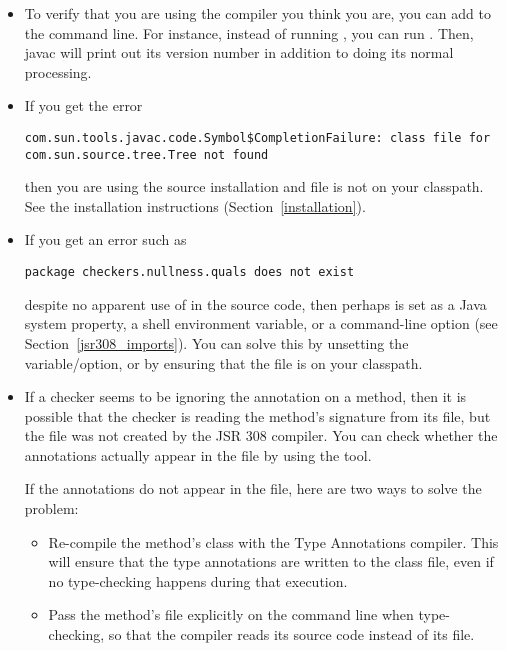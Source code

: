 \begin{itemize}

\item
To verify that you are using the compiler you think you are, you can add
 to the command line.  For instance, instead of running
, you can run .  Then, javac will print out its version number in addition
to doing its normal processing.


\item
If you get the error

\begin{smaller}
\begin{Verbatim}
com.sun.tools.javac.code.Symbol$CompletionFailure: class file for com.sun.source.tree.Tree not found
\end{Verbatim}
\end{smaller}

\noindent
then you are using the source installation and file  is not
on your classpath.  See the installation instructions
(Section~\ref{installation}).


\item
If you get an error such as

\begin{Verbatim}
package checkers.nullness.quals does not exist
\end{Verbatim}

  \noindent
  despite no apparent use of  in
  the source code, then perhaps
   is set as a Java system property, a shell
  environment variable, or a command-line option (see
  Section~\ref{jsr308_imports}).  You can solve this by unsetting the
  variable/option, or by ensuring that the  file is on
  your classpath.


\item
If a checker seems to be ignoring the annotation on a method, then it is
possible that the checker is reading the method's signature from its
 file, but the  file was not created by the JSR
308 compiler.  You can check whether the annotations actually appear in the
 file by using the  tool.

If the annotations do not appear in the  file, here are two
ways to solve the problem:
\begin{itemize}
\item
  Re-compile the method's class with the Type Annotations compiler.  This will
  ensure that the type annotations are written to the class file, even if
  no type-checking happens during that execution.
\item
  Pass the method's file explicitly on the command line when type-checking,
  so that the compiler reads its source code instead of its 
  file.
\end{itemize}


\end{itemize}
